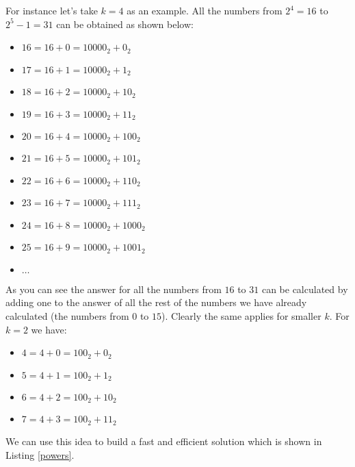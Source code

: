 For instance let's take $k=4$ as an example. All the numbers from $2^4 = 16$ to $2^5-1 = 31$ can be obtained as shown below:
\begin{itemize}
	\item $16 = 16+0 = 10000_2+ 0_2$
	\item $17 = 16+1 = 10000_2+ 1_2$
	\item $18 = 16+2 = 10000_2+ 10_2$
	\item $19 = 16+3 = 10000_2+ 11_2$
	\item $20 = 16+4 = 10000_2+ 100_2$
	\item $21 = 16+5 = 10000_2+ 101_2$
	\item $22 = 16+6 = 10000_2+ 110_2$
	\item $23 = 16+7 = 10000_2+ 111_2$
	\item $24 = 16+8 = 10000_2+ 1000_2$
	\item $25 = 16+9 = 10000_2+ 1001_2$
	\item $\ldots$
\end{itemize}
As you can see the answer for all the numbers from $16$ to $31$ can be calculated by adding one to the
answer of all the rest of the numbers we have already calculated (the numbers from $0$ to $15$).
Clearly the same applies for smaller $k$. 
For $k=2$ we have:
\begin{itemize}
	\item $4 = 4+0 = 100_2+ 0_2$
	\item $5 = 4+1 = 100_2+ 1_2$
	\item $6 = 4+2 = 100_2+ 10_2$
	\item $7 = 4+3 = 100_2+ 11_2$
\end{itemize}
We can use this idea to build a fast and efficient solution which is shown in Listing \ref{powers}.

